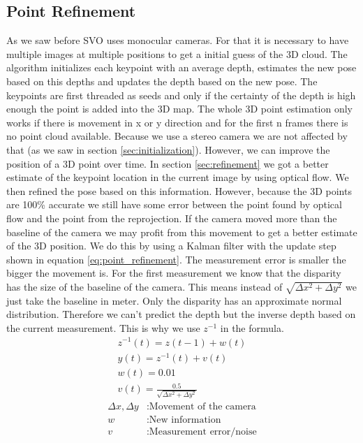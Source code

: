 \documentclass[11pt,a4paper,titlepage,oneside]{report}
\begin{document}
\subsection{Point Refinement}
As we saw before SVO \cite{svo} uses monocular cameras. For that it is necessary to have multiple images at multiple positions to get a initial guess of the 3D cloud. The algorithm initializes each keypoint with an average depth, estimates the new pose based on this depths and updates the depth based on the new pose. The keypoints are first threaded as seeds and only if the certainty of the depth is high enough the point is added into the 3D map. The whole 3D point estimation only works if there is movement in x or y direction and for the first n frames there is no point cloud available. Because we use a stereo camera we are not affected by that (as we saw in section \ref{sec:initialization}). However, we can improve the position of a 3D point over time. In section \ref{sec:refinement} we got a better estimate of the keypoint location in the current image by using optical flow. We then refined the pose based on this information. However, because the 3D points are 100\% accurate we still have some error between the point found by optical flow and the point from the reprojection. If the camera moved more than the baseline of the camera we may profit from this movement to get a better estimate of the 3D position. We do this by using a Kalman filter with the update step shown in equation \ref{eq:point_refinement}. The measurement error is smaller the bigger the movement is. For the first measurement we know that the disparity has the size of the baseline of the camera. This means instead of $\sqrt{\Delta x^2+\Delta y^2}$ we just take the baseline in meter. Only the disparity has an approximate normal distribution. Therefore we can't predict the depth but the inverse depth based on the current measurement. This is why we use $z^{-1}$ in the formula.
\begin{equation}\label{eq:point_refinement}
  \begin{gathered}
    z^{-1}(t)=z(t-1)+w(t)\\
    y(t)=z^{-1}(t)+v(t)\\
    w(t)=0.01\\
    v(t)=\frac{0.5}{\sqrt{\Delta x^2 + \Delta y^2}}
  \end{gathered}
\end{equation}
\begin{align*}
  \Delta x, \Delta y  &: \text{Movement of the camera}\\
  w                   &: \text{New information}\\
  v                   &: \text{Measurement error/noise}\\
\end{align*}
\end{document}
